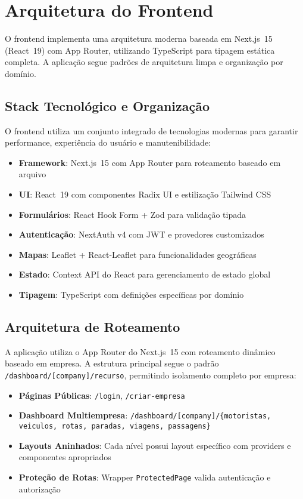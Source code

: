 \section{Arquitetura do Frontend}

O frontend implementa uma arquitetura moderna baseada em Next.js~15 (React~19) com App Router, utilizando TypeScript para tipagem estática completa. A aplicação segue padrões de arquitetura limpa e organização por domínio.

\subsection{Stack Tecnológico e Organização}

O frontend utiliza um conjunto integrado de tecnologias modernas para garantir performance, experiência do usuário e manutenibilidade:

\begin{itemize}
  \item \textbf{Framework}: Next.js~15 com App Router para roteamento baseado em arquivo
  \item \textbf{UI}: React~19 com componentes Radix UI e estilização Tailwind CSS
  \item \textbf{Formulários}: React Hook Form + Zod para validação tipada
  \item \textbf{Autenticação}: NextAuth v4 com JWT e provedores customizados
  \item \textbf{Mapas}: Leaflet + React-Leaflet para funcionalidades geográficas
  \item \textbf{Estado}: Context API do React para gerenciamento de estado global
  \item \textbf{Tipagem}: TypeScript com definições específicas por domínio
\end{itemize}

\subsection{Arquitetura de Roteamento}

A aplicação utiliza o App Router do Next.js~15 com roteamento dinâmico baseado em empresa. A estrutura principal segue o padrão \texttt{/dashboard/[company]/recurso}, permitindo isolamento completo por empresa:

\begin{itemize}
  \item \textbf{Páginas Públicas}: \texttt{/login}, \texttt{/criar-empresa}
  \item \textbf{Dashboard Multiempresa}: \texttt{/dashboard/[company]/\{motoristas, veiculos, rotas, paradas, viagens, passagens\}}
  \item \textbf{Layouts Aninhados}: Cada nível possui layout específico com providers e componentes apropriados
  \item \textbf{Proteção de Rotas}: Wrapper \texttt{ProtectedPage} valida autenticação e autorização
\end{itemize}

